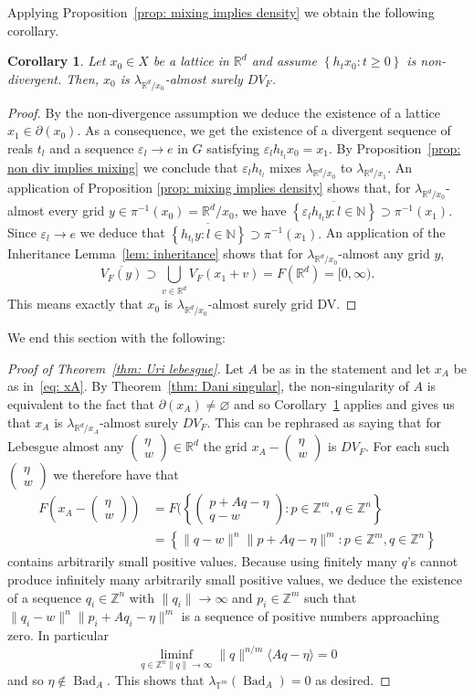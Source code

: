 \documentclass[reqno,11pt, twoside]{amsart}
\theoremstyle{plain}
\newtheorem{cor}[thm]{Corollary}
\theoremstyle{definition}
\theoremstyle{definition}
\theoremstyle{remark}
\numberwithin{equation}{section}
\newcommand{\R}{{\mathbb{R}}}
\newcommand{\N}{{\mathbb{N}}}
\newcommand{\lam}{\lambda}
\newcommand{\bR}{\mathbb{R}}
\newcommand{\bZ}{\mathbb{Z}}
\newcommand{\bT}{\mathbb{T}}
\newcommand\norm[1]{\|#1\|}
\newcommand\seta[1]{\left\{#1\right\}}
\newcommand\pa[1]{\left(#1\right)}
\newcommand\idist[1]{\langle#1\rangle}
\newcommand\on[1]{\operatorname{#1}}
\newcommand\mat[1]{\pa{\begin{matrix}#1\end{matrix}}}
\newcommand\smallmat[1]{\pa{\begin{smallmatrix}#1\end{smallmatrix}}}
\begin{document}
Applying Proposition~\ref{prop: mixing implies density} we obtain the following corollary.
\begin{cor}\label{cor: Haar mixing}
   Let $x_0\in X$ be a lattice in $\bR^d$ and assume $\seta{h_tx_0:t\ge 0}$ is non-divergent. Then, $x_0$ is $\lam_{\bR^d/x_0}$-almost surely $DV_F$. 
\end{cor} 
\begin{proof}
    By the non-divergence assumption we deduce the existence of a lattice
    $x_1\in \partial(x_0)$. As a consequence, we get the existence of a divergent sequence of reals $t_l$ and a sequence $\varepsilon_l\to e$ in $G$ satisfying $\varepsilon_lh_{t_l}x_0=x_1.$
    By Proposition~\ref{prop: non div implies mixing} we conclude that 
    $\varepsilon_lh_{t_l}$ mixes $\lam_{\bR^d/x_0}$ to $\lam_{\bR^d/x_1}$.
    An application of Proposition \ref{prop: mixing implies density} shows that, for $\lam_{\bR^d/x_0}$-almost every grid $y \in \pi^{-1}(x_0) = \R^d/x_0$, we have 
    $
        \overline{\left\lbrace \varepsilon_lh_{t_l}y : l \in \N \right\rbrace} \supset \pi^{-1}(x_1).
    $
    Since $\varepsilon_l\to e$ we deduce that
    $\overline{\left\lbrace h_{t_l}y : l \in \N \right\rbrace} \supset \pi^{-1}(x_1).$
    An application of the Inheritance Lemma~\ref{lem: inheritance} shows that 
    for $\lam_{\bR^d/x_0}$-almost any grid $y$,
    $$\overline{V_F(y)}\supset \bigcup_{v\in \bR^d} V_F(x_1+v) = F(\bR^d) = [0,\infty).$$
    This means exactly that $x_0$ is $\lam_{\bR^d/x_0}$-almost surely grid DV.
\end{proof}
We end this section with the following:
\begin{proof}[Proof of Theorem~\ref{thm: Uri lebesgue}]
    Let $A$ be as in the statement and let $x_A$ be as in~\eqref{eq: xA}. By
    Theorem~\ref{thm: Dani singular}, the non-singularity of $A$ is equivalent to the fact that $\partial(x_A)\ne \varnothing$ and so Corollary~\ref{cor: Haar mixing} applies and gives us that $x_A$ is $\lam_{\bR^d/x_A}$-almost surely $DV_F$. 
    This can be rephrased as saying that for Lebesgue almost any $\smallmat{\eta\\w}\in \bR^d$
    the grid $x_A-\smallmat{\eta\\ w}$ is $DV_F$. 
    For each such $\smallmat{\eta\\ w}$ we therefore have that 
    \begin{align*}
        F(x_A-\mat{\eta\\ w}) &= F(\seta{\mat{p+Aq-\eta \\ q-w}: p\in \bZ^m, q\in \bZ^n}\\
        &= \seta{\norm{q-w}^n \norm{p+Aq-\eta}^m: p\in \bZ^m, q\in \bZ^n}
        \end{align*}
    contains arbitrarily small positive values. Because using finitely many
    $q$'s cannot produce infinitely many arbitrarily small positive values, we deduce the existence of a sequence $q_i\in \bZ^n$ with $\norm{q_i}\to\infty$ and $p_i\in \bZ^m$ such that 
    $\norm{q_i-w}^n \norm{p_i+Aq_i-\eta}^m$ is a sequence of positive numbers approaching zero. In particular
    $$\liminf_{q\in \bZ^n \norm{q}\to\infty}\norm{q}^{n/m} \idist{Aq-\eta} = 0$$
     and so $\eta\notin \on{Bad}_A.$ This shows that $\lam_{\bT^m}(\on{Bad}_A) = 0$ as desired. 
\end{proof}
\end{document}
